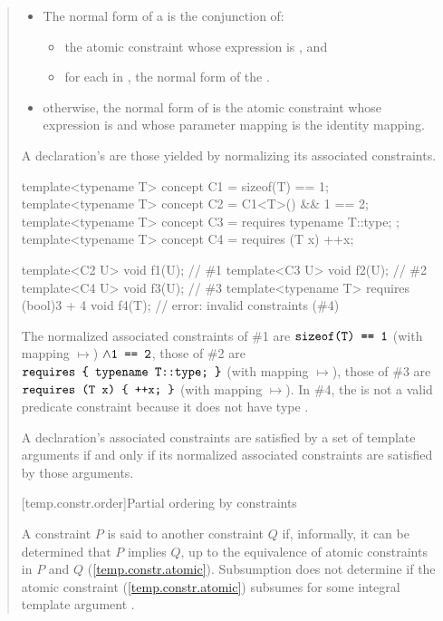 \begin{quote}
\begin{addedblock}
\begin{itemize}
\item The normal form of a   is
the conjunction of:
\begin{itemize}
\item the atomic constraint whose expression is , and
\item for each  in , the
normal form of the .
\end{itemize}

\item otherwise, the normal form of  is the atomic constraint
whose expression is  and whose parameter mapping is the
identity mapping.
\end{itemize}
% 
A declaration's  are those
yielded by normalizing its associated constraints.
% 
\enterexample
\begin{codeblock}
template<typename T> concept C1 = sizeof(T) == 1;
template<typename T> concept C2 = C1<T>() && 1 == 2;
template<typename T> concept C3 = requires { typename T::type; };
template<typename T> concept C4 = requires (T x) { ++x; }

template<C2 U> void f1(U);                            // \#1
template<C3 U> void f2(U);                            // \#2
template<C4 U> void f3(U);                            // \#3
template<typename T> requires (bool)3 + 4 void f4(T); // error: invalid constraints (\#4)
\end{codeblock}
The normalized associated constraints of \#1 are 
$\texttt{sizeof(T) == 1}$ (with mapping $\mapsto$) $\land \texttt{1 == 2}$,
% 
those of \#2 are
$\texttt{requires \{ typename T::type; \}}$ (with mapping $\mapsto$),
%
those of \#3 are
$\texttt{requires (T x) \{ ++x; \}}$ (with mapping $\mapsto$).
% 
In \#4, the  
is not a valid predicate constraint because it does not have type .
\exitexample


\pnum
A declaration's associated constraints are satisfied by a set of template
arguments if and only if its normalized associated constraints are satisfied
by those arguments.


[temp.constr.order]{Partial ordering by constraints}

\pnum
A constraint $P$ is said to  another constraint $Q$ 
if, informally, it can be determined that $P$ implies $Q$, up to 
the equivalence of atomic constraints in $P$ and $Q$
(\ref{temp.constr.atomic}).
% 
\enterexample
Subsumption does not determine if the atomic constraint 
 (\ref{temp.constr.atomic}) subsumes  for some 
integral template argument .
\exitexample


\end{addedblock}
\end{quote}
